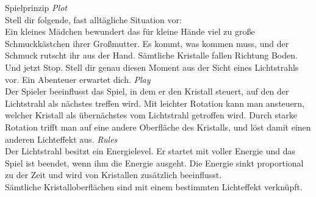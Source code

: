\slideonetoonetoone
{Spielprinzip}
{
	\emph{Plot}\\
	Stell dir folgende, fast alltägliche Situation vor:\\
	Ein kleines Mädchen bewundert das für kleine Hände viel zu große Schmuckkästchen ihrer Großmutter. Es kommt, was kommen muss, und der Schmuck rutscht ihr aus der Hand. Sämtliche Kristalle fallen Richtung Boden. Und jetzt Stop. Stell dir genau diesen Moment aus der Sicht eines Lichtstrahls vor. Ein Abenteuer erwartet dich.
}
{
	\emph{Play}\\
	Der Spieler beeinflusst das Spiel, in dem er den Kristall steuert, auf den der Lichtstrahl als nächstes treffen wird. Mit leichter Rotation kann man ansteuern, welcher Kristall als übernächstes vom Lichtstrahl getroffen wird. Durch starke Rotation trifft man auf eine andere Oberfläche des Kristalls, und löst damit einen anderen Lichteffekt aus.
}
{
	\emph{Rules}\\
	Der Lichtstrahl besitzt ein Energielevel. Er startet mit voller Energie und das Spiel ist beendet, wenn ihm die Energie ausgeht. Die Energie sinkt proportional zu der Zeit und wird von Kristallen zusätzlich beeinflusst.\\
	Sämtliche Kristalloberflächen sind mit einem bestimmten Lichteffekt verknüpft.
}

